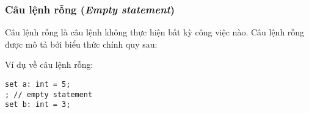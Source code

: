 \subsubsection{\label{ch2:empty_stmt}Câu lệnh rỗng (\textit{Empty statement})}

Câu lệnh rỗng là câu lệnh không thực hiện bất kỳ công việc nào. Câu lệnh rỗng được mô tả bởi biểu thức chính quy sau:

\regexemptystmt

\noindent Ví dụ về câu lệnh rỗng:
\begin{lstlisting}[]
set a: int = 5;
; // empty statement
set b: int = 3;
\end{lstlisting}
